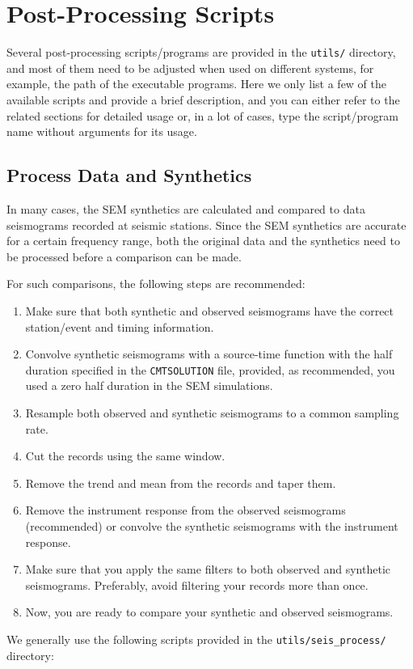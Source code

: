 \chapter{Post-Processing Scripts}

Several post-processing scripts/programs are provided in the \texttt{utils/}
directory, and most of them need to be adjusted when used on different
systems, for example, the path of the executable programs. Here we
only list a few of the available scripts and provide a brief description,
and you can either refer to the related sections for detailed usage
or, in a lot of cases, type the script/program name without arguments
for its usage.


\section{Process Data and Synthetics}\label{sec:Process-data-and-syn}

In many cases, the SEM synthetics are calculated and compared to data
seismograms recorded at seismic stations. Since the SEM synthetics
are accurate for a certain frequency range, both the original data
and the synthetics need to be processed before a comparison can be
made.\newline

For such comparisons, the following steps are recommended:
\begin{enumerate}
\item Make sure that both synthetic and observed seismograms have the correct
station/event and timing information.
\item Convolve synthetic seismograms with a source-time function with the
half duration specified in the \texttt{CMTSOLUTION} file, provided,
as recommended, you used a zero half duration in the SEM simulations.
\item Resample both observed and synthetic seismograms to a common sampling
rate.
\item Cut the records using the same window.
\item Remove the trend and mean from the records and taper them.
\item Remove the instrument response from the observed seismograms (recommended)
or convolve the synthetic seismograms with the instrument response.
\item Make sure that you apply the same filters to both observed and synthetic
seismograms. Preferably, avoid filtering your records more than once.
\item Now, you are ready to compare your synthetic and observed seismograms.
\end{enumerate}
\noindent We generally use the following scripts provided in the \texttt{utils/seis\_process/}
directory:


